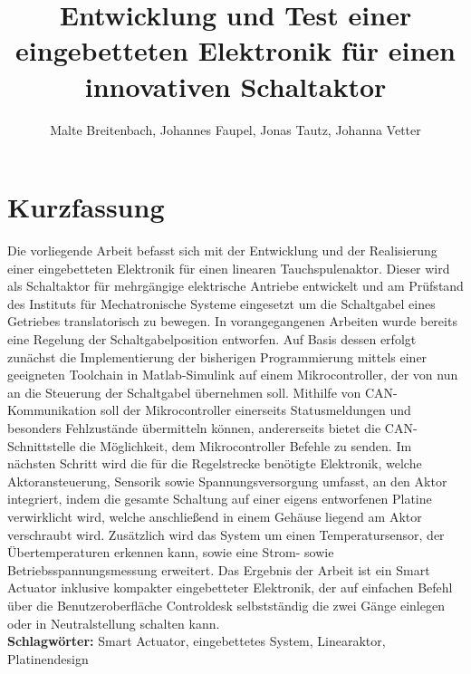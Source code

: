 \documentclass[nochapterpage,bigchapter,linedtoc,longdoc,colorback,accentcolor=tud1c]{tudreport}
\title{Entwicklung und Test einer eingebetteten Elektronik für einen innovativen Schaltaktor}
\subtitle{Malte Breitenbach, Johannes Faupel, Jonas Tautz, Johanna Vetter}
\begin{document}
\maketitle
{}
{}
\section*{Kurzfassung}
Die vorliegende Arbeit befasst sich mit der Entwicklung und der Realisierung  einer eingebetteten Elektronik für einen linearen Tauchspulenaktor. Dieser wird als Schaltaktor für mehrgängige elektrische Antriebe entwickelt und am Prüfstand des Instituts für Mechatronische Systeme eingesetzt um die Schaltgabel eines Getriebes translatorisch zu bewegen.
In vorangegangenen Arbeiten wurde bereits eine Regelung der Schaltgabelposition entworfen. Auf Basis dessen erfolgt zunächst die Implementierung der bisherigen Programmierung mittels einer geeigneten Toolchain in Matlab-Simulink auf einem Mikrocontroller, der von nun an die Steuerung der Schaltgabel übernehmen soll. Mithilfe von CAN-Kommunikation soll der Mikrocontroller einerseits Statusmeldungen und besonders Fehlzustände übermitteln können, andererseits bietet die CAN-Schnittstelle die Möglichkeit, dem Mikrocontroller Befehle zu senden. Im nächsten Schritt wird die für die Regelstrecke benötigte Elektronik, welche Aktoransteuerung, Sensorik sowie Spannungsversorgung umfasst, an den Aktor integriert, indem die gesamte Schaltung auf einer eigens entworfenen Platine verwirklicht wird, welche anschließend in einem Gehäuse liegend am Aktor verschraubt wird. Zusätzlich wird das System um einen Temperatursensor, der Übertemperaturen erkennen kann, sowie eine Strom- sowie Betriebsspannungsmessung erweitert.
Das Ergebnis der Arbeit ist ein Smart Actuator inklusive kompakter eingebetteter Elektronik, der auf einfachen Befehl über die Benutzeroberfläche Controldesk selbstständig die zwei Gänge einlegen oder in Neutralstellung schalten kann.\\

\textbf{Schlagwörter:} Smart Actuator, eingebettetes System, Linearaktor, Platinendesign
\end{document}
